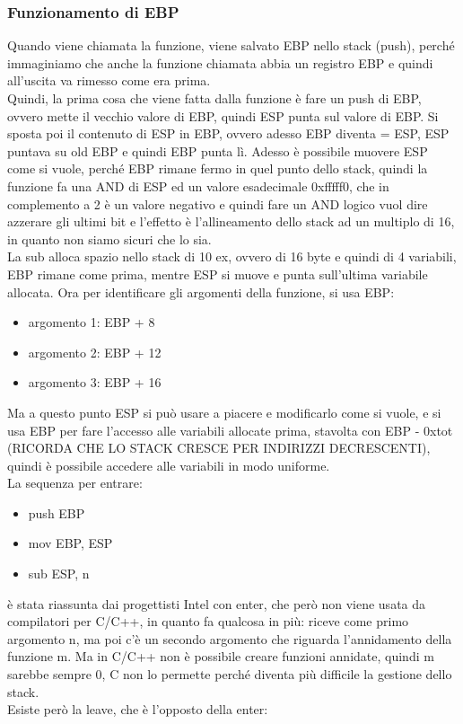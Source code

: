 \documentclass[12pt, oneside]{extbook}
\begin{document}
\subsubsection{Funzionamento di EBP}
Quando viene chiamata la funzione, viene salvato EBP nello stack (\textsf{push}), perché immaginiamo che anche la funzione chiamata abbia un registro EBP e quindi all'uscita va rimesso come era prima.\\ Quindi, la prima cosa che viene fatta dalla funzione è fare un push di EBP, ovvero mette il vecchio valore di EBP, quindi ESP punta sul valore di EBP. Si sposta poi il contenuto di ESP in EBP, ovvero adesso EBP diventa = ESP, ESP puntava su old EBP e quindi EBP punta lì. Adesso è possibile muovere ESP come si vuole, perché EBP rimane fermo in quel punto dello stack, quindi la funzione fa una AND di ESP ed un valore esadecimale 0xfffff0, che in complemento a 2 è un valore negativo e quindi fare un AND logico vuol dire azzerare gli ultimi bit e l'effetto è l'allineamento dello stack ad un multiplo di 16, in quanto non siamo sicuri che lo sia.\\ La \textsf{sub} alloca spazio nello stack di 10 ex, ovvero di 16 byte e quindi di 4 variabili, EBP rimane come prima, mentre ESP si muove e punta sull'ultima variabile allocata. Ora per identificare gli argomenti della funzione, si usa EBP:
\begin{itemize}
\item argomento 1: EBP + 8
\item argomento 2: EBP + 12
\item argomento 3: EBP + 16
\end{itemize}
Ma a questo punto ESP si può usare a piacere e modificarlo come si vuole, e si usa EBP per fare l'accesso alle variabili allocate prima, stavolta con EBP - 0xtot (RICORDA CHE LO STACK CRESCE PER INDIRIZZI DECRESCENTI), quindi è possibile accedere alle variabili in modo uniforme.\\ La sequenza per entrare:
\begin{itemize}
\item \textsf{push EBP}
\item \textsf{mov EBP, ESP}
\item \textsf{sub ESP, n}
\end{itemize}
è stata riassunta dai progettisti Intel con \textsf{enter}, che però non viene usata da compilatori per C/C++, in quanto fa qualcosa in più: riceve come primo argomento n, ma poi c'è un secondo argomento che riguarda l'annidamento della funzione m. Ma in C/C++ non è possibile creare funzioni annidate, quindi m sarebbe sempre 0, C non lo permette perché diventa più difficile la gestione dello stack.\\ Esiste però la \textsf{leave}, che è l'opposto della \textsf{enter}:
\end{document}
